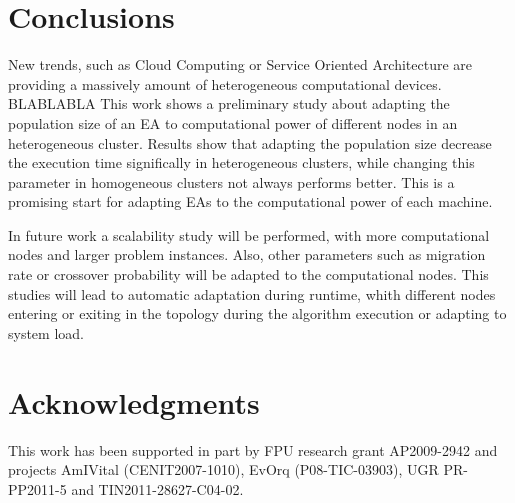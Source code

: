 \documentclass{sig-alternate}
\begin{document}


\section{Conclusions}
New trends, such as Cloud Computing or Service Oriented Architecture are providing a massively amount of heterogeneous computational devices. BLABLABLA This work shows a preliminary study about adapting the population size of an EA to computational power of different nodes in an heterogeneous cluster. Results show that adapting the population size decrease the execution time significally in heterogeneous clusters, while changing this parameter in homogeneous clusters not always performs better. This is a promising start for adapting EAs to the computational power of each machine.

In future work a scalability study will be performed, with more computational nodes and larger problem instances. Also, other parameters such as migration rate or crossover probability will be adapted to the computational nodes. This studies will lead to automatic adaptation during runtime, whith different nodes entering or exiting in the topology during the algorithm execution or adapting to system load.


\section{Acknowledgments}
This work has been supported in part by FPU research grant AP2009-2942 and projects AmIVital (CENIT2007-1010), EvOrq (P08-TIC-03903), UGR PR-PP2011-5 and TIN2011-28627-C04-02.

%



\end{document}

